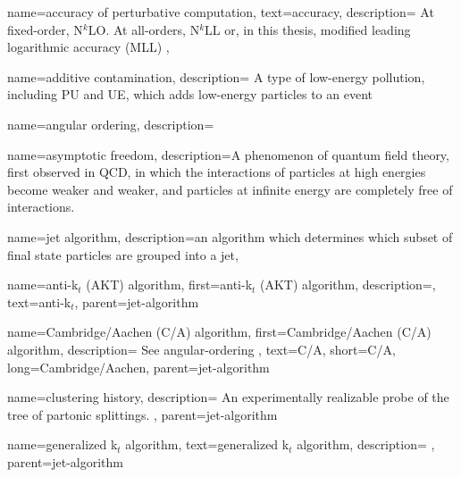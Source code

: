 {
  name=accuracy of perturbative computation,
  text=accuracy,
  description={
      At fixed-order, N\(^k\)LO.
      At all-orders, N\(^k\)LL or, in this thesis, modified leading logarithmic accuracy (MLL)
  },
}


{
    name=additive contamination,
    description={
        A type of low-energy pollution, including PU and UE, which adds low-energy particles to an event
    }
}

{
    name=angular ordering,
    description={
    }
}

{
    name=asymptotic freedom,
    description={A phenomenon of quantum field theory, first observed in QCD, in which the interactions of particles at high energies become weaker and weaker, and particles at infinite energy are completely free of interactions.}
}



{
    name=jet algorithm,
    description={an algorithm which determines which subset of final state particles are grouped into a jet},
}

    {
        name=anti-k\(_t\) (AKT) algorithm,
        first={anti-k\(_t\) (AKT) algorithm},
        description={},
        text={anti-k\(_t\)},
        parent=jet-algorithm
    }

    {
        name=Cambridge/Aachen (C/A) algorithm,
        first={Cambridge/Aachen (C/A) algorithm},
        description={
            See angular-ordering
        },
        text={C/A},
        short={C/A},
        long={Cambridge/Aachen},
        parent=jet-algorithm
    }

    {
        name=clustering history,
        description={
            An experimentally realizable probe of the tree of partonic splittings.
        },
        parent=jet-algorithm
    }

    {
        name=generalized k\(_t\) algorithm,
        text={generalized k\(_t\) algorithm},
        description={
        },
        parent=jet-algorithm
    }


